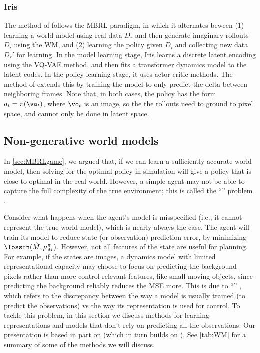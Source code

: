 \subsubsection{Iris}
\label{sec:iris}

The  method
of \citep{iris} follows the MBRL paradigm,
in which it alternates beween
(1) learning a world model
using real data $D_r$
and then  generate imaginary rollouts $D_i$ using the WM,
and (2)
learning the policy given $D_i$
and collecting new data $D_r'$ for learning.
In the model learning stage,
Iris learns a discrete latent
encoding using the VQ-VAE method,
and then  fits a transformer dynamics
model to the latent codes.
In the policy learning stage, it uses actor critic methods.
The 
method of \citep{delta-iris}
extends this by training the model to only predict
the delta between neighboring frames.
Note that, in both cases, the policy has the form $a_t=\pi(\vo_t)$,
where $\vo_t$ is an image, so the
the rollouts need to ground to pixel space, and cannot only
be done in latent space.

 



\subsection{Non-generative world models}
\label{sec:nongen}
\label{sec:MBRLnongen}


In \cref{sec:MBRLgame}, we argued that, if we can learn a sufficiently accurate world
model, then solving for the optimal policy in simulation will give
a policy that is close to optimal in the real world.
However, a simple agent may not be able to capture the full complexity
of the true environment;
this is called the ``'' problem
\citep{Dong2022,bitByBit,Arumugam2024,Kumar2024}.

Consider what happens when the agent's model is misspecified (i.e., it cannot
represent the true world model), which is nearly always the case.
The agent will train its model
to reduce state (or observation) prediction error,
by minimizing $\lossfn(\hat{M}, \mu_M^{\pi})$.
However, not all features of the state are useful for planning.
For example, if the states are images, a dynamics model
with limited representational capacity may choose
to focus on predicting the background pixels
rather than more control-relevant features, like small moving
objects, since predicting the background reliably
reduces the MSE more.
This is due to ``''
\citep{Lambert2020RL,Wei2023MBRL},
which refers to the discrepancy between the way a
model is usually trained (to predict the observations)
vs the way its representation is used for control.
To tackle this problem, in this section we discuss methods
for learning representations and models that don't rely on
predicting all the observations.
Our presentation is based in part
on   \citep{Ni2024} (which in turn builds on
\citep{Subramanian2022}).
See \cref{tab:WM} for a summary of some of the methods
we will discuss.



